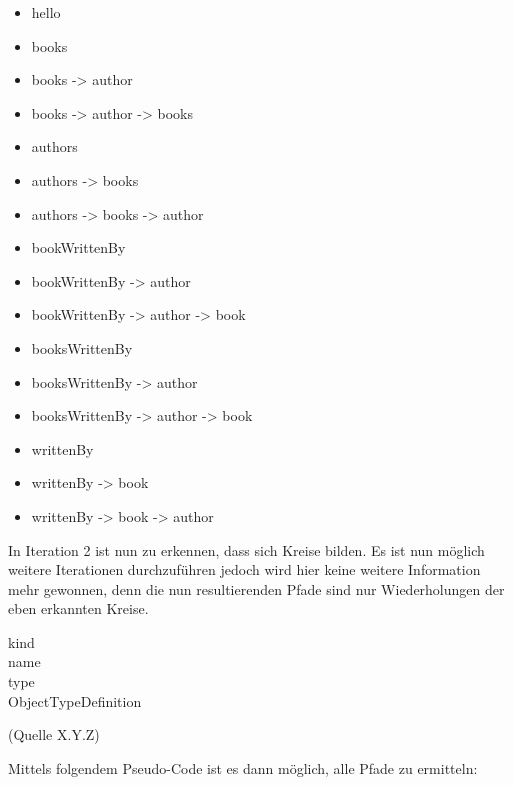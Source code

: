 \begin{itemize}
  \item hello
  \item books
  \item books -> author
  \item books -> author -> books
  \item authors
  \item authors -> books
  \item authors -> books -> author
  \item bookWrittenBy
  \item bookWrittenBy -> author
  \item bookWrittenBy -> author -> book
  \item booksWrittenBy
  \item booksWrittenBy -> author
  \item booksWrittenBy -> author -> book
  \item writtenBy
  \item writtenBy -> book
  \item writtenBy -> book -> author
\end{itemize}

In Iteration 2 ist nun zu erkennen, dass sich Kreise bilden. Es ist nun möglich weitere Iterationen durchzuführen jedoch
wird hier keine weitere Information mehr gewonnen, denn die nun resultierenden Pfade sind nur Wiederholungen der eben erkannten
Kreise.










\begin{center}
  \begin{description}
    \item[kind]
    \item[name]
    \item[type]
    \item[ObjectTypeDefinition]
  \end{description} (Quelle X.Y.Z)
\end{center}

Mittels folgendem Pseudo-Code ist es dann möglich, alle Pfade zu ermitteln:


